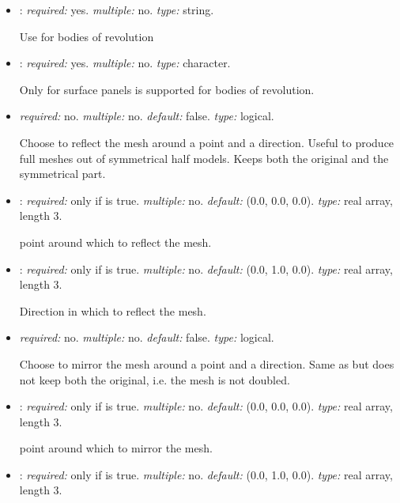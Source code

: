 \begin{itemize}

\item {}: \textit{required:} yes. \textit{multiple:} no. 
\textit{type:} string. 

Use  for bodies of revolution

\item {}: \textit{required:} yes. \textit{multiple:} no. 
\textit{type:} character.

    Only  for surface panels is supported for bodies of revolution.

\item {} \textit{required:} no. \textit{multiple:} no. 
\textit{default:} false. \textit{type:} logical.

Choose to reflect the mesh around a point and a direction. 
Useful to produce full meshes out of symmetrical half models. 
Keeps both the original and the symmetrical part. 

\item {}: \textit{required:} only if 
 is true. \textit{multiple:} no. 
\textit{default:} (0.0, 0.0, 0.0). \textit{type:} real array, length 3.

point around which to reflect the mesh.

\item {}: \textit{required:} only if 
 is true. \textit{multiple:} no. 
\textit{default:} (0.0, 1.0, 0.0). \textit{type:} real array, length 3.

Direction in which to reflect the mesh.

\item {} \textit{required:} no. \textit{multiple:} no. 
\textit{default:} false. \textit{type:} logical.

Choose to mirror the mesh around a point and a direction. Same as 
 but does not keep both the original, i.e. the mesh is not doubled.

\item {}: \textit{required:} only if 
 is true. \textit{multiple:} no. 
\textit{default:} (0.0, 0.0, 0.0). \textit{type:} real array, length 3.

point around which to mirror the mesh.

\item {}: \textit{required:} only if 
 is true. \textit{multiple:} no. 
\textit{default:} (0.0, 1.0, 0.0). \textit{type:} real array, length 3.


\end{itemize}
